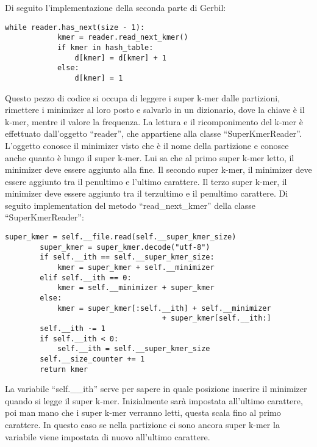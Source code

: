 Di seguito l'implementazione della seconda parte di Gerbil:
\begin{lstlisting}[label={lst:secondapartegerbil}]
        while reader.has_next(size - 1):
            kmer = reader.read_next_kmer()
            if kmer in hash_table:
                d[kmer] = d[kmer] + 1
            else:
                d[kmer] = 1
\end{lstlisting}
Questo pezzo di codice si occupa di leggere i super k-mer dalle partizioni, rimettere i minimizer al loro posto e salvarlo in un dizionario, dove la chiave \`e il k-mer,
mentre il valore la frequenza.
La lettura e il ricomponimento del k-mer \`e effettuato dall'oggetto ``reader'', che appartiene alla classe ``SuperKmerReader''.
L'oggetto conosce il minimizer visto che \`e il nome della partizione e conosce anche quanto \`e lungo il super k-mer.
Lui sa che al primo super k-mer letto, il minimizer deve essere aggiunto alla fine.
Il secondo super k-mer, il minimizer deve essere aggiunto tra il penultimo e l'ultimo carattere.
Il terzo super k-mer, il minimizer deve essere aggiunto tra il terzultimo e il penultimo carattere.
Di seguito implementation del metodo ``read\_next\_kmer'' della classe ``SuperKmerReader'':
\begin{lstlisting}[label={lst:superkmerreader}]
super_kmer = self.__file.read(self.__super_kmer_size)
        super_kmer = super_kmer.decode("utf-8")
        if self.__ith == self.__super_kmer_size:
            kmer = super_kmer + self.__minimizer
        elif self.__ith == 0:
            kmer = self.__minimizer + super_kmer
        else:
            kmer = super_kmer[:self.__ith] + self.__minimizer
                                    + super_kmer[self.__ith:]
        self.__ith -= 1
        if self.__ith < 0:
            self.__ith = self.__super_kmer_size
        self.__size_counter += 1
        return kmer
\end{lstlisting}
La variabile ``self.\_\_ith'' serve per sapere in quale posizione inserire il minimizer quando si legge il super k-mer.
Inizialmente sar\`a impostata all'ultimo carattere, poi man mano che i super k-mer verranno letti, questa scala fino al primo carattere.
In questo caso se nella partizione ci sono ancora super k-mer la variabile viene impostata di nuovo all'ultimo carattere.

